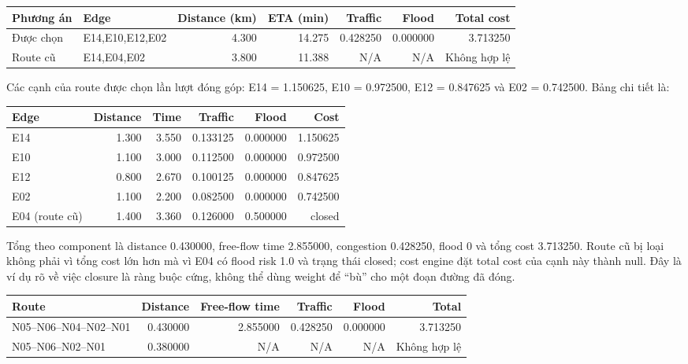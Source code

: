 \begin{center}
{\scriptsize
\begin{tabular}{l l r r r r r}
\toprule
Phương án & Edge & Distance (km) & ETA (min) & Traffic & Flood & Total cost\\
\midrule
Được chọn & E14,E10,E12,E02 & 4.300 & 14.275 & 0.428250 & 0.000000 & 3.713250\\
Route cũ & E14,E04,E02 & 3.800 & 11.388 & N/A & N/A & Không hợp lệ\\
\bottomrule
\end{tabular}
}
\end{center}

Các cạnh của route được chọn lần lượt đóng góp: E14 = 1.150625, E10 = 0.972500, E12 = 0.847625 và E02 = 0.742500. Bảng chi tiết là:
\begin{center}
{\scriptsize
\begin{tabular}{l r r r r r}
\toprule
Edge & Distance & Time & Traffic & Flood & Cost\\
\midrule
E14 & 1.300 & 3.550 & 0.133125 & 0.000000 & 1.150625\\
E10 & 1.100 & 3.000 & 0.112500 & 0.000000 & 0.972500\\
E12 & 0.800 & 2.670 & 0.100125 & 0.000000 & 0.847625\\
E02 & 1.100 & 2.200 & 0.082500 & 0.000000 & 0.742500\\
E04 (route cũ) & 1.400 & 3.360 & 0.126000 & 0.500000 & closed\\
\bottomrule
\end{tabular}
}
\end{center}
Tổng theo component là distance 0.430000, free-flow time 2.855000, congestion 0.428250, flood 0 và tổng cost 3.713250. Route cũ bị loại không phải vì tổng cost lớn hơn mà vì E04 có flood risk 1.0 và trạng thái closed; cost engine đặt total cost của cạnh này thành null. Đây là ví dụ rõ về việc closure là ràng buộc cứng, không thể dùng weight để ``bù'' cho một đoạn đường đã đóng.

\begin{center}
{\scriptsize
\begin{tabular}{l r r r r r}
\toprule
Route & Distance & Free-flow time & Traffic & Flood & Total\\
\midrule
N05--N06--N04--N02--N01 & 0.430000 & 2.855000 & 0.428250 & 0.000000 & 3.713250\\
N05--N06--N02--N01 & 0.380000 & N/A & N/A & N/A & Không hợp lệ\\
\bottomrule
\end{tabular}
}
\end{center}

